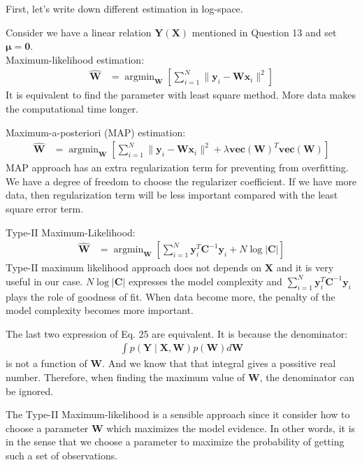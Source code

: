 \documentclass[12pt]{article}
\newenvironment{question}[2][Question]{\begin{trivlist}
\kern10pt
\item[\hskip \labelsep {\bfseries #1}\hskip \labelsep {\bfseries #2.}]}{\end{trivlist}}
\begin{document}
\begin{question}{14}
First, let's write down different estimation in log-space.

Consider we have a linear relation $\mathbf{Y}(\mathbf{X})$ mentioned in Question 13
and set $\bm{\mu} = \mathbf{0}$.
\\ 
Maximum-likelihood estimation:
\begin{align*}
  \hat{\mathbf{W}} 
  &= \operatorname{argmin}_{\mathbf{W}}
    [\sum_{i=1}^{N} \| \mathbf{y}_i - \mathbf{W}\mathbf{x}_i\|^2]
\end{align*}
It is equivalent to find the parameter with least square method. More data makes
the computational time longer.

Maximum-a-posteriori (MAP) estimation:
\begin{align*}
  \hat{\mathbf{W}} 
  &= \operatorname{argmin}_{\mathbf{W}}
    [\sum_{i=1}^{N} \| \mathbf{y}_i - \mathbf{W}\mathbf{x}_i\|^2
      + \lambda \textbf{vec}(\textbf{W})^T\textbf{vec}(\textbf{W})]
\end{align*}
MAP approach has an extra regularization term for preventing from overfitting.
We have a degree of freedom to choose the regularizer coefficient.
If we have more data, then regularization term will be less important compared
with the least square error term.

Type-II Maximum-Likelihood:
\begin{align*}
  \hat{\mathbf{W}} 
  &= \operatorname{argmin}_{\mathbf{W}}
    [\sum_{i=1}^{N} \mathbf{y}_i^T \mathbf{C}^{-1}\mathbf{y}_i
      + N\log{|\mathbf{C}|}]
\end{align*}
Type-II maximum likelihood approach does not depends on $\mathbf{X}$ and it is
very useful in our case. $N\log{|\mathbf{C}|}$ expresses the model complexity
and $\sum_{i=1}^{N} \mathbf{y}_i^T \mathbf{C}^{-1}\mathbf{y}_i$ plays the role of
goodness of fit. When data become more, the penalty of the model complexity becomes
more important.
  
The last two expression of Eq. 25 are equivalent. It is because the denominator:
  \begin{align*}
    \int p(\mathbf{Y}\mid\mathbf{X}, \mathbf{W})p(\mathbf{W})d\mathbf{W}
  \end{align*}
is not a function of $\mathbf{W}$. And we know that that integral gives a possitive
real number. Therefore, when finding the maximum value of $\mathbf{W}$, the denominator 
can be ignored.

The Type-II Maximum-likelihood is a sensible approach since it consider how to
 choose a parameter $\mathbf{W}$ which maximizes the model evidence. In other words,
 it is in the sense that we choose a parameter to maximize the probability of 
 getting such a set of observations.
\end{question}
\end{document}
